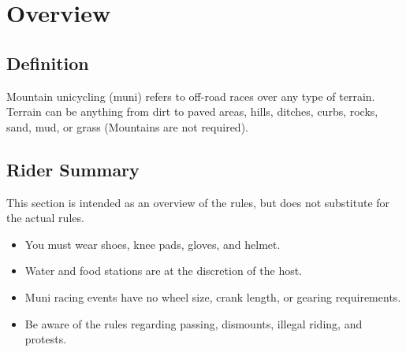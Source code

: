 \chapter{Overview \label{chap:muni_racing}}

\section{Definition}

Mountain unicycling (muni) refers to off-road races over any type of terrain.
Terrain can be anything from dirt to paved areas, hills, ditches, curbs, rocks, sand, mud, or grass (Mountains are not required).

\section{Rider Summary}

This section is intended as an overview of the rules, but does not
substitute for the actual rules.
\begin{itemize}
\item You must wear shoes, knee pads, gloves, and helmet.
\item Water and food stations are at the discretion of the host.
\item Muni racing events have no wheel size, crank length, or gearing 
requirements.
\item Be aware of the rules regarding passing, dismounts, illegal riding, and protests.
\end{itemize}
